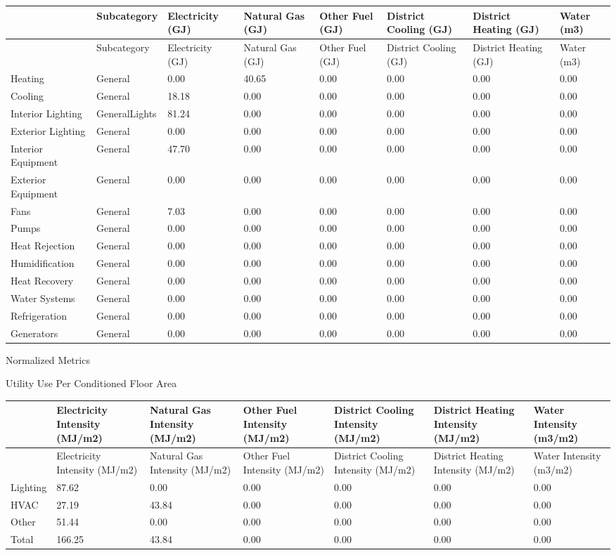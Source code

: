 {\scriptsize
\begin{longtable}[c]{>{\raggedright}p{0.75in}>{\raggedright}p{0.75in}>{\raggedright}p{0.75in}>{\raggedright}p{0.75in}>{\raggedright}p{0.75in}>{\raggedright}p{0.75in}>{\raggedright}p{0.75in}>{\raggedright}p{0.75in}}
\toprule
~ & Subcategory & Electricity (GJ) & Natural Gas (GJ) & Other Fuel (GJ) & District Cooling (GJ) & District Heating (GJ) & Water (m3) \tabularnewline
\midrule
\endfirsthead

\toprule
~ & Subcategory & Electricity (GJ) & Natural Gas (GJ) & Other Fuel (GJ) & District Cooling (GJ) & District Heating (GJ) & Water (m3) \tabularnewline
\midrule
\endhead

Heating & General & 0.00 & 40.65 & 0.00 & 0.00 & 0.00 & 0.00 \tabularnewline
Cooling & General & 18.18 & 0.00 & 0.00 & 0.00 & 0.00 & 0.00 \tabularnewline
Interior Lighting & GeneralLights & 81.24 & 0.00 & 0.00 & 0.00 & 0.00 & 0.00 \tabularnewline
Exterior Lighting & General & 0.00 & 0.00 & 0.00 & 0.00 & 0.00 & 0.00 \tabularnewline
Interior Equipment & General & 47.70 & 0.00 & 0.00 & 0.00 & 0.00 & 0.00 \tabularnewline
Exterior Equipment & General & 0.00 & 0.00 & 0.00 & 0.00 & 0.00 & 0.00 \tabularnewline
Fans & General & 7.03 & 0.00 & 0.00 & 0.00 & 0.00 & 0.00 \tabularnewline
Pumps & General & 0.00 & 0.00 & 0.00 & 0.00 & 0.00 & 0.00 \tabularnewline
Heat Rejection & General & 0.00 & 0.00 & 0.00 & 0.00 & 0.00 & 0.00 \tabularnewline
Humidification & General & 0.00 & 0.00 & 0.00 & 0.00 & 0.00 & 0.00 \tabularnewline
Heat Recovery & General & 0.00 & 0.00 & 0.00 & 0.00 & 0.00 & 0.00 \tabularnewline
Water Systems & General & 0.00 & 0.00 & 0.00 & 0.00 & 0.00 & 0.00 \tabularnewline
Refrigeration & General & 0.00 & 0.00 & 0.00 & 0.00 & 0.00 & 0.00 \tabularnewline
Generators & General & 0.00 & 0.00 & 0.00 & 0.00 & 0.00 & 0.00 \tabularnewline
\bottomrule
\end{longtable}}

Normalized Metrics

Utility Use Per Conditioned Floor Area

\begin{longtable}[c]{>{\raggedright}p{0.85in}>{\raggedright}p{0.85in}>{\raggedright}p{0.85in}>{\raggedright}p{0.85in}>{\raggedright}p{0.85in}>{\raggedright}p{0.85in}>{\raggedright}p{0.85in}}
\toprule
~ & Electricity Intensity (MJ/m2) & Natural Gas Intensity (MJ/m2) & Other Fuel Intensity (MJ/m2) & District Cooling Intensity (MJ/m2) & District Heating Intensity (MJ/m2) & Water Intensity (m3/m2) \tabularnewline
\midrule
\endfirsthead

\toprule
~ & Electricity Intensity (MJ/m2) & Natural Gas Intensity (MJ/m2) & Other Fuel Intensity (MJ/m2) & District Cooling Intensity (MJ/m2) & District Heating Intensity (MJ/m2) & Water Intensity (m3/m2) \tabularnewline
\midrule
\endhead

Lighting & 87.62 & 0.00 & 0.00 & 0.00 & 0.00 & 0.00 \tabularnewline
HVAC & 27.19 & 43.84 & 0.00 & 0.00 & 0.00 & 0.00 \tabularnewline
Other & 51.44 & 0.00 & 0.00 & 0.00 & 0.00 & 0.00 \tabularnewline
Total & 166.25 & 43.84 & 0.00 & 0.00 & 0.00 & 0.00 \tabularnewline
\bottomrule
\end{longtable}

